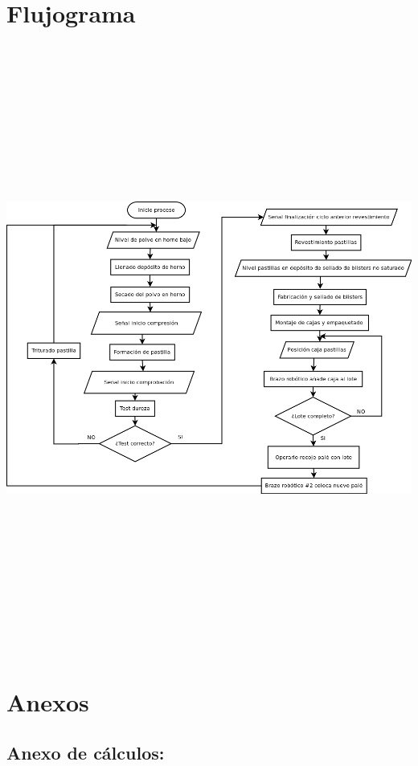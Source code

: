 \section{Flujograma}
\includegraphics[width=15cm,height=20cm,keepaspectratio]{Planos/Flujograma.png}
\section{Anexos}

   
\subsection{Anexo de cálculos:}


